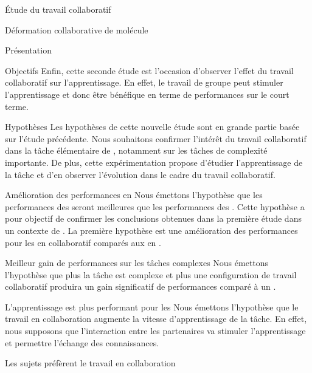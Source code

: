 \documentclass[myfrancais]{mythesis}
\begin{document}
\begin{mypart}{Étude du travail collaboratif}
\begin{mychapter}{Déformation collaborative de molécule}
\begin{mysection}{Présentation}
\begin{mysubsection}{Objectifs}
					Enfin, cette seconde étude est l'occasion d'observer l'effet du travail collaboratif sur l'apprentissage.
					En effet, le travail de groupe peut stimuler l'apprentissage et donc être bénéfique en terme de performances sur le court terme.
				\end{mysubsection}
				\begin{mysubsection}{Hypothèses}
					Les hypothèses de cette nouvelle étude sont en grande partie basée sur l'étude précédente.
					Nous souhaitons confirmer l'intérêt du travail collaboratif dans la tâche élémentaire de , notamment sur les tâches de complexité importante.
					De plus, cette expérimentation propose d'étudier l'apprentissage de la tâche et d'en observer l'évolution dans le cadre du travail collaboratif.
					\begin{myparagraph}{ Amélioration des performances en }
						Nous émettons l'hypothèse que les performances des  seront meilleures que les performances des .
						Cette hypothèse a pour objectif de confirmer les conclusions obtenues dans la première étude dans un contexte de .
						La première hypothèse est une amélioration des performances pour les  en collaboratif comparés aux  en .
					\end{myparagraph}
					\begin{myparagraph}{ Meilleur gain de performances sur les tâches complexes}
						Nous émettons l'hypothèse que plus la tâche est complexe et plus une configuration de travail collaboratif produira un gain significatif de performances comparé à un .
					\end{myparagraph}
					\begin{myparagraph}{ L'apprentissage est plus performant pour les }
						Nous émettons l'hypothèse que le travail en collaboration augmente la vitesse d'apprentissage de la tâche.
						En effet, nous supposons que l'interaction entre les partenaires va stimuler l'apprentissage et permettre l'échange des connaissances.
					\end{myparagraph}
					\begin{myparagraph}{ Les sujets préfèrent le travail en collaboration}

\end{myparagraph}
\end{mysubsection}
\end{mysection}
\end{mychapter}
\end{mypart}
\end{document}
